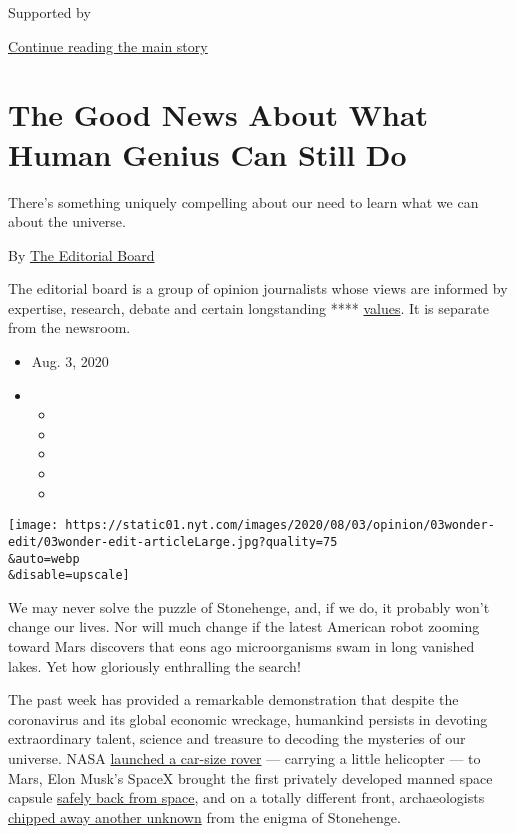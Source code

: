 Supported by

\protect\hyperlink{after-sponsor}{Continue reading the main story}

\hypertarget{the-good-news-about-what-human-genius-can-still-do}{%
\section{The Good News About What Human Genius Can Still
Do}\label{the-good-news-about-what-human-genius-can-still-do}}

There's something uniquely compelling about our need to learn what we
can about the universe.

By
\href{https://www.nytimes.com/interactive/opinion/editorialboard.html}{The
Editorial Board}

The editorial board is a group of opinion journalists whose views are
informed by expertise, research, debate and certain longstanding ****
\href{https://www.nytimes.com/interactive/2018/opinion/editorialboard.html}{values}.
It is separate from the newsroom.

\begin{itemize}
\item
  Aug. 3, 2020
\item
  \begin{itemize}
  \item
  \item
  \item
  \item
  \item
  \end{itemize}
\end{itemize}

\texttt{[image: https://static01.nyt.com/images/2020/08/03/opinion/03wonder-edit/03wonder-edit-articleLarge.jpg?quality=75\\\&auto=webp\\\&disable=upscale]}

We may never solve the puzzle of Stonehenge, and, if we do, it probably
won't change our lives. Nor will much change if the latest American
robot zooming toward Mars discovers that eons ago microorganisms swam in
long vanished lakes. Yet how gloriously enthralling the search!

The past week has provided a remarkable demonstration that despite the
coronavirus and its global economic wreckage, humankind persists in
devoting extraordinary talent, science and treasure to decoding the
mysteries of our universe. NASA
\href{https://www.nytimes.com/2020/07/30/science/nasa-mars-launch.html?searchResultPosition=3}{launched
a car-size rover} --- carrying a little helicopter --- to Mars, Elon
Musk's SpaceX brought the first privately developed manned space capsule
\href{https://www.nytimes.com/video/us/100000007269118/spacex-splash-down.html?searchResultPosition=2}{safely
back from space}, and on a totally different front, archaeologists
\href{https://www.nytimes.com/2020/07/29/science/stonehenge-archaeology-sarsens.html?searchResultPosition=1}{chipped
away another unknown} from the enigma of Stonehenge.

